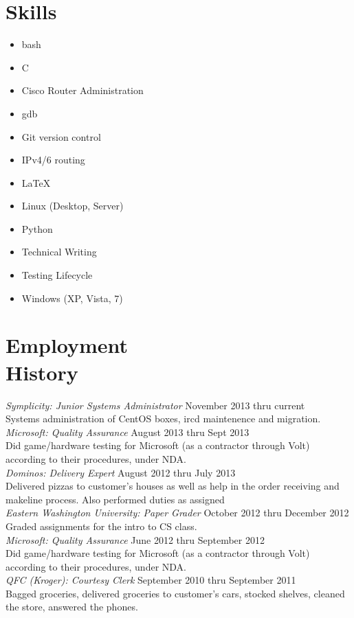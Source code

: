 \documentclass[line, margin]{res}
\begin{document}
\begin{resume}
\section{Skills}
\begin{multicols}{3}
  \begin{itemize}
    \item bash
    \item C
    \item Cisco Router Administration
    \item gdb
    \item Git version control
    \item IPv4/6 routing
    \item \LaTeX
    \item Linux (Desktop, Server)
    \item Python
    \item Technical Writing
    \item Testing Lifecycle
    \item Windows (XP, Vista, 7)
  \end{itemize}
\end{multicols}

\section{Employment\\History}
 \textit{Symplicity: Junior Systems Administrator} \hfill November 2013 thru current \\
 Systems administration of CentOS boxes, ircd maintenence and migration.
 \textit{Microsoft: Quality Assurance} \hfill August 2013 thru Sept 2013 \\
 Did game/hardware testing for Microsoft (as a contractor through Volt) according to their procedures, under NDA. \\ [6pt]
 \textit{Dominos: Delivery Expert} \hfill August 2012 thru July 2013 \\
 Delivered pizzas to customer's houses as well as help in the order
 receiving and makeline process. Also performed duties as assigned \\ [6pt]
 \textit{Eastern Washington University: Paper Grader} \hfill October 2012 thru December 2012 \\
 Graded assignments for the intro to CS class. \\ [6pt]
 \textit{Microsoft: Quality Assurance} \hfill June 2012 thru September 2012 \\
 Did game/hardware testing for Microsoft (as a contractor through Volt) according to their procedures, under NDA. \\ [6pt]
 \textit{QFC (Kroger): Courtesy Clerk} \hfill September 2010 thru September 2011 \\
 Bagged groceries, delivered groceries to customer's cars, stocked
 shelves, cleaned the store, answered the phones. \\ 

\end{resume}
\end{document}
